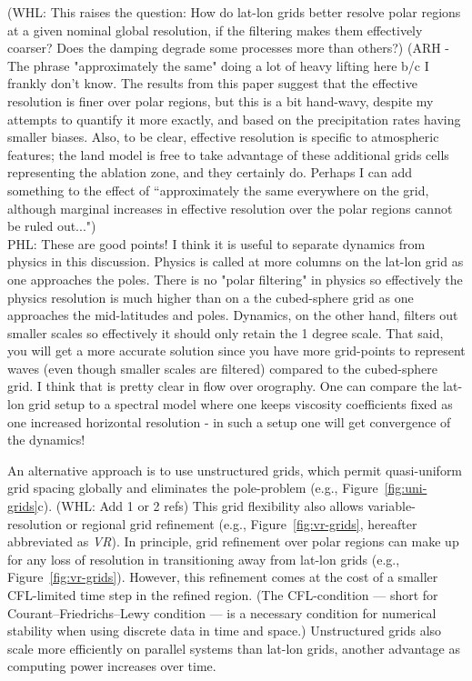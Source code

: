 \documentclass[draft]{agujournal2019}
\begin{document}
{\color{blue} (WHL: This raises the question: How do lat-lon grids better resolve polar regions at a given nominal global resolution, if the filtering makes them effectively coarser?  Does the damping degrade some processes more than others?)}{\color{red} (ARH - The phrase "approximately the same" doing a lot of heavy lifting here b/c I frankly don't know. The results from this paper suggest that the effective resolution is finer over polar regions, but this is a bit hand-wavy, despite my attempts to quantify it more exactly, and based on the precipitation rates having smaller biases. Also, to be clear, effective resolution is specific to atmospheric features; the land model is free to take advantage of these additional grids cells representing the ablation zone, and they certainly do. Perhaps I can add something to the effect of ``approximately the same everywhere on the grid, although marginal increases in effective resolution over the polar regions cannot be ruled out...")\\

{\color{purple}PHL: These are good points! I think it is useful to separate dynamics from physics in this discussion. Physics is called at more columns on the lat-lon grid as one approaches the poles. There is no "polar filtering" in physics so effectively the physics resolution is much higher than on a the cubed-sphere grid as one approaches the mid-latitudes and poles. Dynamics, on the other hand, filters out smaller scales so effectively it should only retain the 1 degree scale. That said, you will get a more accurate solution since you have more grid-points to represent waves (even though smaller scales are filtered) compared to the cubed-sphere grid. I think that is pretty clear in flow over orography. One can compare the lat-lon grid setup to a spectral model where one keeps viscosity coefficients fixed as one increased horizontal resolution - in such a setup one will get convergence of the dynamics!}}

An alternative approach is to use unstructured grids, which permit quasi-uniform grid spacing globally and eliminates the pole-problem (e.g., Figure~\ref{fig:uni-grids}c).
{\color{blue} (WHL: Add 1 or 2 refs)}
This grid flexibility also allows variable-resolution or regional grid refinement (e.g., Figure~\ref{fig:vr-grids}, hereafter abbreviated as \textit{VR}). In principle, grid refinement over polar regions can make up for any loss of resolution in transitioning away from lat-lon grids (e.g., Figure~\ref{fig:vr-grids}).  However, this refinement comes at the cost of a smaller CFL-limited time step in the refined region. (The CFL-condition --- short for Courant–Friedrichs–Lewy condition --- is a necessary condition for numerical stability when using discrete data in time and space.) Unstructured grids also scale more efficiently on parallel systems than lat-lon grids, another advantage as computing power increases over time.
\end{document}
